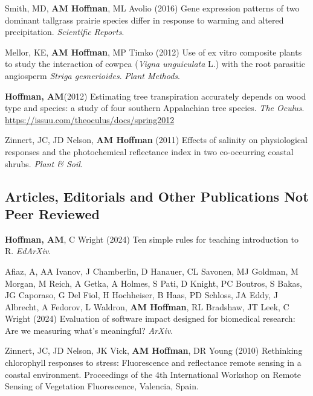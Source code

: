 \documentclass{cv}
\begin{document}
\begin{pubenum}
\item Smith, MD, \textbf{AM Hoffman}, ML Avolio (2016) Gene expression patterns of two dominant tallgrass prairie species differ in response to warming and altered precipitation. \textit{Scientific Reports}. 

\item Mellor, KE, \textbf{AM Hoffman}, MP Timko (2012) Use of ex vitro composite plants to study the interaction of cowpea (\textit{Vigna unguiculata} L.) with the root parasitic angiosperm \textit{Striga gesnerioides}. \textit{Plant Methods}. 

\sloppy %
\item\textbf{Hoffman, AM}\footnotemark[1] (2012) Estimating tree transpiration accurately depends on wood type and species: a study of four southern Appalachian tree species. \textit{The Oculus}. \href{https://issuu.com/theoculus/docs/spring2012}{https://issuu.com/theoculus/docs/spring2012}

\item Zinnert, JC, JD Nelson, \textbf{AM Hoffman} (2011) Effects of salinity on physiological responses and the photochemical reflectance index in two co-occurring coastal shrubs. \textit{Plant \& Soil}. 

\end{pubenum}

\subsection*{Articles, Editorials and Other Publications Not Peer Reviewed}

\textbf{Hoffman, AM}, C Wright (2024) Ten simple rules for teaching introduction to R. \textit{EdArXiv}. 

Afiaz, A, AA Ivanov, J Chamberlin, D Hanauer, CL Savonen, MJ Goldman, M Morgan, M Reich, A Getka, A Holmes, S Pati, D Knight, PC Boutros, S Bakas, JG Caporaso, G Del Fiol, H Hochheiser, B Haas, PD Schloss, JA Eddy, J Albrecht, A Fedorov, L Waldron, \textbf{AM Hoffman}, RL Bradshaw, JT Leek, C Wright (2024) Evaluation of software impact designed for biomedical research: Are we measuring what's meaningful? \textit{ArXiv}. 

Zinnert, JC, JD Nelson, JK Vick, \textbf{AM Hoffman}, DR Young (2010) Rethinking chlorophyll responses to stress: Fluorescence and reflectance remote sensing in a coastal environment. Proceedings of the 4th International Workshop on Remote Sensing of Vegetation Fluorescence, Valencia, Spain.
\end{document}
